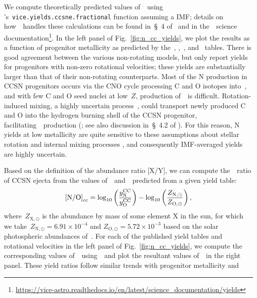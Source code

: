 \documentclass[ms.tex]{subfiles}
\begin{document}
We compute theoretically predicted values of~~using
\vice's~\texttt{vice.yields.ccsne.fractional} function assuming a
\citet{Kroupa2001} IMF; details on how~\vice~handles these calculations can be
found in~\S~4 of~\citet{Griffith2021a} and in the~\vice~science 
documentation\footnote{
\url{https://vice-astro.readthedocs.io/en/latest/science_documentation/yields}
}.
In the left panel of Fig.~\ref{fig:n_cc_yields}, we plot the results as a
function of progenitor metallicity as predicted by the~\citet{Woosley1995},
\citet*{Nomoto2013},~\citet{Sukhbold2016}, and~\citet{Limongi2018} tables.
There is good agreement between the various non-rotating models, but only
\citet{Limongi2018} report yields for progenitors with non-zero rotational
velocities; these yields are substantially larger than that of their
non-rotating counterparts.
Most of the N production in CCSN progenitors occurs via the CNO cycle
processing C and O isotopes into~\Nfourteen, and with few C and O seed nuclei
at low~$Z$, production of~\Nfourteen~is difficult.
Rotation-induced mixing, a highly uncertain process~\citep{Zahn1992, Maeder1998,
Lagarde2012}, could transport newly produced C and O into the hydrogen burning
shell of the CCSN progenitor, facilitating~\Nfourteen~production
(\citealp{Frischknecht2016}; see also discussion in~\S~4.2 of
\citealp{Andrews2017}).
For this reason, N yields at low metallicity are quite sensitive to these
assumptions about stellar rotation and internal mixing processes
\citep{Heger2010}, and consequently IMF-averaged yields are highly uncertain.
\par
Based on the definition of the abundance ratio [X/Y], we can compute
the~\no~ratio of CCSN ejecta from the values of~~and~~predicted
from a given yield table:
\begin{equation}
\text{[N/O]}_\text{cc} = 
\log_{10}\left(\frac{y_\text{N}^\text{CC}}{y_\text{O}^\text{CC}}\right) -
\log_{10}\left(\frac{Z_{\text{N},\odot}}{Z_{\text{O},\odot}}\right),
\label{eq:no_subcc}
\end{equation}
where~$Z_{\text{X},\odot}$ is the abundance by mass of some element X in the
sun, for which we take~$Z_{\text{N},\odot} = 6.91\times10^{-4}$ and
$Z_{\text{O},\odot} = 5.72\times10^{-3}$ based on the solar photospheric
abundances of~\citet{Asplund2009}.
For each of the published yield tables and rotational velocities in the left
panel of Fig.~\ref{fig:n_cc_yields}, we compute the corresponding values
of~~using~\vice~and plot the resultant values of~\no\subcc~in the right
panel.
These yield ratios follow similar trends with progenitor metallicity and
\end{document}
